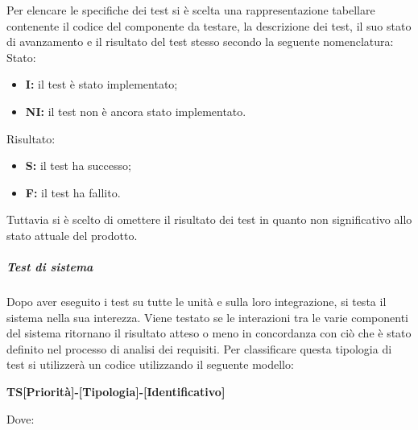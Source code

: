                 Per elencare le specifiche dei test si è scelta una rappresentazione tabellare contenente il codice del componente da testare, la descrizione dei test, il suo stato di avanzamento e il risultato del test stesso secondo la seguente nomenclatura: \\
                Stato:
                \begin{itemize}
                    \item \textbf{I:} il test è stato implementato;
                    \item \textbf{NI:} il test non è ancora stato implementato.     
                \end{itemize}
                Risultato:
                \begin{itemize}
                    \item \textbf{S:} il test ha successo;
                    \item \textbf{F:} il test ha fallito.
                \end{itemize}
                Tuttavia si è scelto di omettere il risultato dei test in quanto non significativo allo stato attuale del prodotto.


            \subparagraph*{Test di sistema}
                Dopo aver eseguito i test su tutte le unità e sulla loro integrazione, si testa il sistema nella sua interezza. Viene testato se le interazioni tra le varie componenti del sistema ritornano il risultato atteso o meno in concordanza con ciò che è stato definito nel processo di analisi dei requisiti.
                Per classificare questa tipologia di test si utilizzerà un codice utilizzando il seguente modello:     

                \begin{center}
                	\textbf{TS[Priorità]-[Tipologia]-[Identificativo]}
                \end{center}
                Dove: 
                
